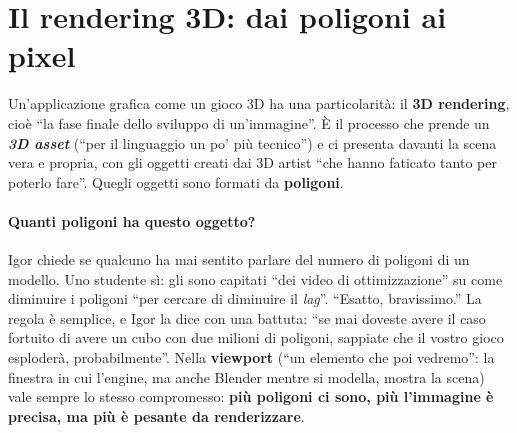 \section{Il rendering 3D: dai poligoni ai pixel}
\label{ue1:sec:rendering}

Un'applicazione grafica come un gioco 3D ha una particolarità: il \textbf{3D
rendering}, cioè ``la fase finale dello sviluppo di un'immagine''. È il processo che
prende un \textbf{\emph{3D asset}} (``per il linguaggio un po' più tecnico'') e ci
presenta davanti la scena vera e propria, con gli oggetti creati dai 3D artist ``che
hanno faticato tanto per poterlo fare''. Quegli oggetti sono formati da
\textbf{poligoni}.

\paragraph{Quanti poligoni ha questo oggetto?} Igor chiede se qualcuno ha mai sentito
parlare del numero di poligoni di un modello. Uno studente sì: gli sono capitati ``dei
video di ottimizzazione'' su come diminuire i poligoni ``per cercare di diminuire il
\emph{lag}''. ``Esatto, bravissimo.'' La regola è semplice, e Igor la dice con una
battuta: ``se mai doveste avere il caso fortuito di avere un cubo con due milioni di
poligoni, sappiate che il vostro gioco esploderà, probabilmente''. Nella
\textbf{viewport} (``un elemento che poi vedremo'': la finestra in cui l'engine, ma
anche Blender mentre si modella, mostra la scena) vale sempre lo stesso compromesso:
\textbf{più poligoni ci sono, più l'immagine è precisa, ma più è pesante da
renderizzare}.

